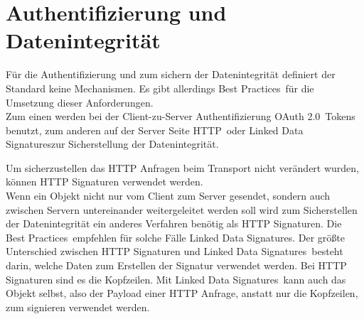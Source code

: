 \section{Authentifizierung und Datenintegrität}
	Für die Authentifizierung und zum sichern der Datenintegrität definiert der Standard keine Mechanismen. Es gibt allerdings \glqq Best Practices\grqq~für die Umsetzung dieser Anforderungen.\\
	
	Zum einen werden bei der Client-zu-Server Authentifizierung \glqq OAuth 2.0\grqq~Tokens benutzt, zum anderen auf der Server Seite \glqq HTTP\grqq~oder \glqq Linked Data Signatures\grqq zur Sicherstellung der Datenintegrität.\\
	
	
	
	Um sicherzustellen das HTTP Anfragen beim Transport nicht verändert wurden, können HTTP Signaturen verwendet werden.\\
	Wenn ein Objekt nicht nur vom Client zum Server gesendet, sondern auch zwischen Servern untereinander weitergeleitet werden soll wird zum Sicherstellen der Datenintegrität ein anderes Verfahren benötig als HTTP Signaturen. Die \glqq Best Practices\grqq~empfehlen für solche Fälle \glqq Linked Data Signatures\grqq. Der größte Unterschied zwischen HTTP Signaturen und \glqq Linked Data Signatures\grqq~besteht darin, welche Daten zum Erstellen der Signatur verwendet werden. Bei HTTP Signaturen sind es die Kopfzeilen. Mit \glqq Linked Data Signatures\grqq~kann auch das Objekt selbst, also der Payload einer HTTP Anfrage, anstatt nur die Kopfzeilen, zum signieren verwendet werden.
